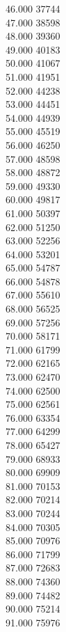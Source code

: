 { 46.000	37744 \\
 47.000	38598 \\
 48.000	39360 \\
 49.000	40183 \\
 50.000	41067 \\
 51.000	41951 \\
 52.000	44238 \\
 53.000	44451 \\
 54.000	44939 \\
 55.000	45519 \\
 56.000	46250 \\
 57.000	48598 \\
 58.000	48872 \\
 59.000	49330 \\
 60.000	49817 \\
 61.000	50397 \\
 62.000	51250 \\
 63.000	52256 \\
 64.000	53201 \\
 65.000	54787 \\
 66.000	54878 \\
 67.000	55610 \\
 68.000	56525 \\
 69.000	57256 \\
 70.000	58171 \\
 71.000	61799 \\
 72.000	62165 \\
 73.000	62470 \\
 74.000	62500 \\
 75.000	62561 \\
 76.000	63354 \\
 77.000	64299 \\
 78.000	65427 \\
 79.000	68933 \\
 80.000	69909 \\
 81.000	70153 \\
 82.000	70214 \\
 83.000	70244 \\
 84.000	70305 \\
 85.000	70976 \\
 86.000	71799 \\
 87.000	72683 \\
 88.000	74360 \\
 89.000	74482 \\
 90.000	75214 \\
 91.000	75976 \\
}
